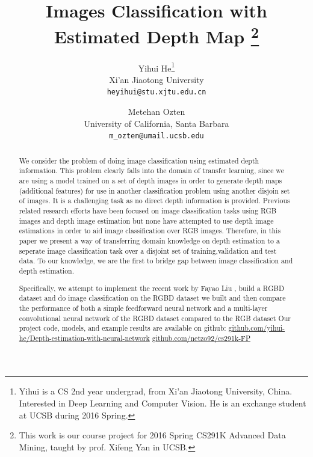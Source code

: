 \documentclass[10pt,twocolumn,letterpaper]{article}
\begin{document}
\title{Images Classification with Estimated Depth Map
\thanks{This work is our course project for 2016 Spring CS291K Advanced Data Mining, taught by prof. Xifeng Yan in UCSB.}}
\author{Yihui He\thanks{Yihui is a CS 2nd year undergrad, 
from Xi'an Jiaotong University, China. 
Interested in Deep Learning and Computer Vision. 
He is an exchange student at UCSB during 2016 Spring.}\\
Xi'an Jiaotong University\\
{\tt\small heyihui@stu.xjtu.edu.cn}
\and
Metehan Ozten\\
University of California, Santa Barbara\\
{\tt\small m\_ozten@umail.ucsb.edu}
}


\maketitle

\begin{abstract}
We consider the problem of doing image classification using estimated depth 
information. This problem clearly falls into the domain of transfer learning, since we are using a model trained on a set of depth images in order to generate depth maps (additional features) for use in another classification problem using another disjoin set of images. It is a challenging task as no direct depth information is 
provided. Previous related research efforts have been focused on image classification tasks using
RGB images and depth image estimation but none have attempted to use depth image estimations in order to aid image classification over RGB images. Therefore, in this paper we present a way of 
transferring domain knowledge on depth estimation to a seperate image classification task over a disjoint set of training,validation and test data. 
To our knowledge, we are the first to bridge gap between image classification and depth estimation.

Specifically, we attempt to implement the recent work by Fayao 
Liu \etal\cite{liu2015deep}, build a RGBD dataset and do image classification 
on the RGBD dataset we built and then compare the performance of both a simple feedforward neural network and a multi-layer convolutional neural network of the RGBD dataset compared to the RGB dataset 
Our project code, models, and example results are available on github: \href{
https://github.com/yihui-he/Depth-estimation-with-neural-network 
}{github.com/yihui-he/Depth-estimation-with-neural-network}
\href{https://github.com/netzo92/cs291k-FP}{github.com/netzo92/cs291k-FP}
\end{abstract}
\end{document}
